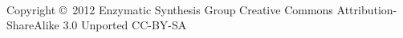 \thispagestyle{empty}

~\vfill

Copyright \copyright\ 2012 Enzymatic Synthesis Group
\newline
\newline
Creative Commons Attribution-ShareAlike 3.0 Unported
\newline
\newline
CC-BY-SA
\pagebreak

\setcounter{page}{3}

